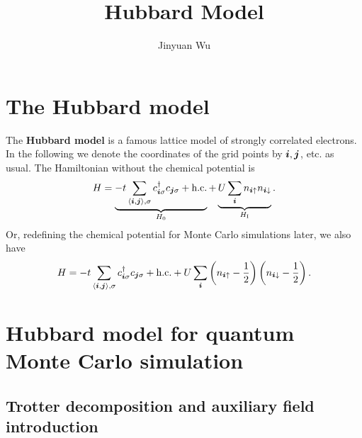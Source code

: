 \documentclass[hyperref, a4paper]{article}
\title{Hubbard Model}
\author{Jinyuan Wu}
\newcommand*{\pair}[1]{\langle #1 \rangle}
\newcommand*{\concept}[1]{{\textbf{#1}}}
\begin{document}
\maketitle

\section{The Hubbard model}

The \concept{Hubbard model} is a famous lattice model of strongly correlated electrons. In the following we denote the coordinates of the grid points by $\vb*{i}, \vb*{j}$, etc. as usual.
The Hamiltonian without the chemical potential is
\begin{equation}
    {H} = \underbrace{-t \sum_{\pair{\vb*{i}, \vb*{j}}, \sigma} {c}_{\vb*{i}\sigma}^\dagger {c}_{\vb*{j}\sigma} + \text{h.c.}}_{{H}_0} + \underbrace{U \sum_{\vb*{i}} {n}_{\vb*{i} \uparrow} {n}_{\vb*{i} \downarrow}}_{{H}_\text{I}}.
\end{equation}
Or, redefining the chemical potential for Monte Carlo simulations later, we also have
\begin{equation}
    {H} = -t \sum_{\pair{\vb*{i}, \vb*{j}}, \sigma} {c}_{\vb*{i}\sigma}^\dagger {c}_{\vb*{j}\sigma} + \text{h.c.} 
    + U \sum_{\vb*{i}} \left({n}_{\vb*{i} \uparrow} - \frac{1}{2}\right) \left({n}_{\vb*{i} \downarrow} - \frac{1}{2}\right).
\end{equation}

\section{Hubbard model for quantum Monte Carlo simulation}

\subsection{Trotter decomposition and auxiliary field introduction}
\end{document}
